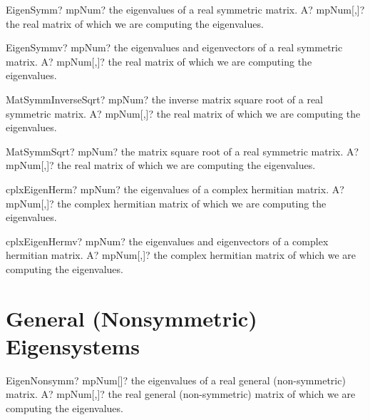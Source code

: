 \documentclass[12pt,a4paper,openany]{book}
\begin{document}
\begin{mpFunctionsExtract}
\mpFunctionOne
{EigenSymm? mpNum? the eigenvalues of a real symmetric matrix.}
{A? mpNum[,]? the real matrix of which we are computing the eigenvalues.}
\end{mpFunctionsExtract}

\begin{mpFunctionsExtract}
\mpFunctionOne
{EigenSymmv? mpNum? the eigenvalues and eigenvectors of a real symmetric matrix.}
{A? mpNum[,]? the real matrix of which we are computing the eigenvalues.}
\end{mpFunctionsExtract}

\begin{mpFunctionsExtract}
\mpFunctionOne
{MatSymmInverseSqrt? mpNum? the inverse matrix square root of a real symmetric matrix.}
{A? mpNum[,]? the real matrix of which we are computing the eigenvalues.}
\end{mpFunctionsExtract}

\begin{mpFunctionsExtract}
\mpFunctionOne
{MatSymmSqrt? mpNum? the matrix square root of a real symmetric matrix.}
{A? mpNum[,]? the real matrix of which we are computing the eigenvalues.}
\end{mpFunctionsExtract}

\begin{mpFunctionsExtract}
\mpFunctionOne
{cplxEigenHerm? mpNum? the eigenvalues of a complex hermitian matrix.}
{A? mpNum[,]? the complex hermitian  matrix of which we are computing the eigenvalues.}
\end{mpFunctionsExtract}

\begin{mpFunctionsExtract}
\mpFunctionOne
{cplxEigenHermv? mpNum? the eigenvalues and eigenvectors of a complex hermitian matrix.}
{A? mpNum[,]? the complex hermitian  matrix of which we are computing the eigenvalues.}
\end{mpFunctionsExtract}

\section{General (Nonsymmetric) Eigensystems}

\begin{mpFunctionsExtract}
\mpFunctionOne
{EigenNonsymm? mpNum[]? the eigenvalues of a real general (non-symmetric) matrix.}
{A? mpNum[,]? the real general (non-symmetric) matrix of which we are computing the eigenvalues.}
\end{mpFunctionsExtract}
\end{document}
